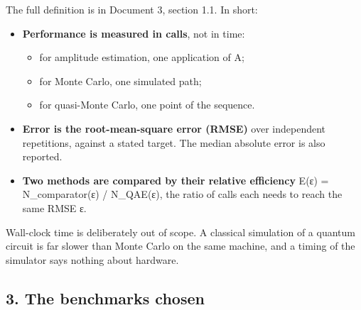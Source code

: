 \documentclass[
  10pt,
]{article}
\providecommand{\tightlist}{%
  \setlength{\itemsep}{0pt}\setlength{\parskip}{0pt}}
\begin{document}
The full definition is in Document 3, section 1.1. In short:

\begin{itemize}
\tightlist
\item
  \textbf{Performance is measured in calls}, not in time:

  \begin{itemize}
  \tightlist
  \item
    for amplitude estimation, one application of A;
  \item
    for Monte Carlo, one simulated path;
  \item
    for quasi-Monte Carlo, one point of the sequence.
  \end{itemize}
\item
  \textbf{Error is the root-mean-square error (RMSE)} over independent
  repetitions, against a stated target. The median absolute error is
  also reported.
\item
  \textbf{Two methods are compared by their relative efficiency} E(ε) =
  N\_comparator(ε) / N\_QAE(ε), the ratio of calls each needs to reach
  the same RMSE ε.
\end{itemize}

Wall-clock time is deliberately out of scope. A classical simulation of
a quantum circuit is far slower than Monte Carlo on the same machine,
and a timing of the simulator says nothing about hardware.

\hypertarget{3-the-benchmarks-chosen}{%
\subsection{3. The benchmarks chosen}\label{3-the-benchmarks-chosen}}
\end{document}
